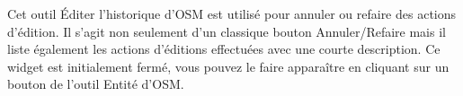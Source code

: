 
Cet outil Éditer l'historique d'OSM est utilisé pour annuler ou refaire des actions d'édition. Il s'agit non seulement d'un classique bouton Annuler/Refaire mais il liste également les actions d'éditions effectuées avec une courte description. Ce widget est initialement fermé, vous pouvez le faire apparaître en cliquant sur un bouton de l'outil Entité d'OSM.


